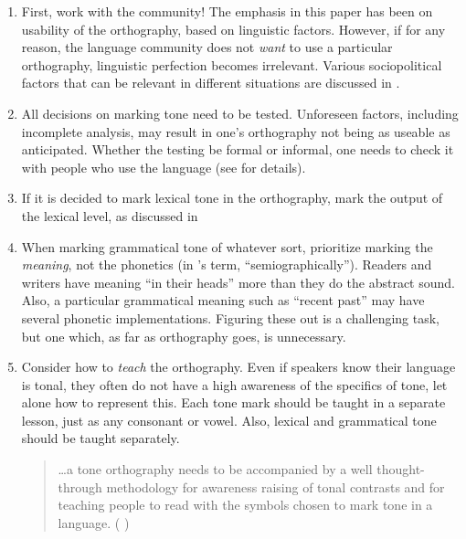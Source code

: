 \documentclass[output=paper]{langscibook}
\begin{document}
\begin{enumerate}
\item First, work with the community! The emphasis in this paper has been on usability of the orthography, based on linguistic factors. However, if for any reason, the language community does not \textit{want} to use a particular orthography, linguistic perfection becomes irrelevant. Various sociopolitical factors that can be relevant in different situations are discussed in \citet{Cahill2014}.

\item All decisions on marking tone need to be tested. Unforeseen factors, including incomplete analysis, may result in one’s orthography not being as useable as anticipated. Whether the testing be formal or informal, one needs to check it with people who use the language (see \citealt{Karan2014} for details).

\item If it is decided to mark lexical tone in the orthography, mark the output of the lexical level, as discussed in  
\item When marking grammatical tone of whatever sort, prioritize marking the \textit{meaning}, not the phonetics (in \citealt{Roberts2013}’s term, “semiographically”). Readers and writers have meaning “in their heads” more than they do the abstract sound. Also, a particular grammatical meaning such as “recent past” may have several phonetic implementations. Figuring these out is a challenging task, but one which, as far as orthography goes, is unnecessary.
\item Consider how to \textit{teach} the orthography. Even if speakers know their language is tonal, they often do not have a high awareness of the specifics of tone, let alone how to represent this. Each tone mark should be taught in a separate lesson, just as any consonant or vowel. Also, lexical and grammatical tone should be taught separately. 


\begin{quote}
…a tone orthography needs to be accompanied by a well thought-through methodology for awareness raising of tonal contrasts and for teaching people to read with the symbols chosen to mark tone in a language. ( \citealt[52]{Kutsch2014})
\end{quote}


\end{enumerate}
\end{document}
